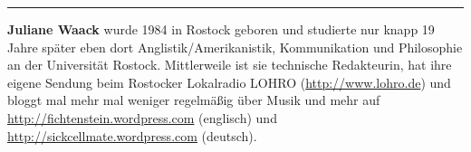 \begin{center}\rule{0.5\linewidth}{\linethickness}\end{center}

\textbf{Juliane Waack} wurde 1984 in Rostock geboren und studierte nur
knapp 19 Jahre später eben dort Anglistik/Amerikanistik, Kommunikation
und Philosophie an der Universität Rostock. Mittlerweile ist sie
technische Redakteurin, hat ihre eigene Sendung beim Rostocker
Lokalradio LOHRO (\url{http://www.lohro.de}) und bloggt mal mehr mal
weniger regelmäßig über Musik und mehr auf
\url{http://fichtenstein.wordpress.com} (englisch) und
\url{http://sickcellmate.wordpress.com} (deutsch).
